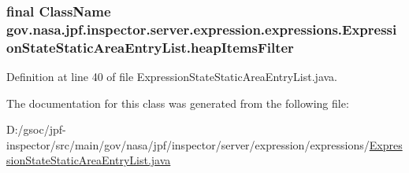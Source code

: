 \subsubsection[{\texorpdfstring{heap\+Items\+Filter}{heapItemsFilter}}]{\setlength{\rightskip}{0pt plus 5cm}final {\bf Class\+Name} gov.\+nasa.\+jpf.\+inspector.\+server.\+expression.\+expressions.\+Expression\+State\+Static\+Area\+Entry\+List.\+heap\+Items\+Filter\hspace{0.3cm}{\ttfamily [private]}}\hypertarget{classgov_1_1nasa_1_1jpf_1_1inspector_1_1server_1_1expression_1_1expressions_1_1_expression_state_static_area_entry_list_a9c9eb1befb339add68a81b78db3a8703}{}\label{classgov_1_1nasa_1_1jpf_1_1inspector_1_1server_1_1expression_1_1expressions_1_1_expression_state_static_area_entry_list_a9c9eb1befb339add68a81b78db3a8703}


Definition at line 40 of file Expression\+State\+Static\+Area\+Entry\+List.\+java.



The documentation for this class was generated from the following file\+:\begin{DoxyCompactItemize}
\item 
D\+:/gsoc/jpf-\/inspector/src/main/gov/nasa/jpf/inspector/server/expression/expressions/\hyperlink{_expression_state_static_area_entry_list_8java}{Expression\+State\+Static\+Area\+Entry\+List.\+java}\end{DoxyCompactItemize}
